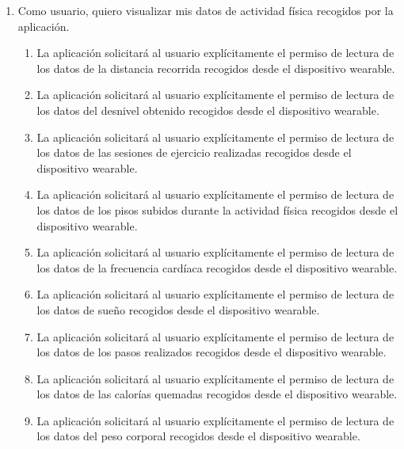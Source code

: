         \begin{enumerate}[resume=req-usuario,label=\textbf{\texttt{RU-\arabic*}}]
            \item \label{req:usuario:visualizar_actividad_fisica} Como usuario, quiero visualizar mis datos de actividad física recogidos por la aplicación.
            \begin{enumerate}[resume=req-funcionales,label=\textbf{\texttt{RF-\arabic*}}]
                \item \label{req:funcionales:permiso_distancia} La aplicación solicitará al usuario explícitamente el permiso de lectura de los datos de la distancia recorrida recogidos desde el dispositivo \gls{wearable}.
                \item \label{req:funcionales:permiso_desnivel} La aplicación solicitará al usuario explícitamente el permiso de lectura de los datos del desnivel obtenido recogidos desde el dispositivo \gls{wearable}. 
                \item \label{req:funcionales:permiso_ejercicio} La aplicación solicitará al usuario explícitamente el permiso de lectura de los datos de las sesiones de ejercicio realizadas recogidos desde el dispositivo \gls{wearable}.
                \item \label{req:funcionales:permiso_plantas} La aplicación solicitará al usuario explícitamente el permiso de lectura de los datos de los pisos subidos durante la actividad física recogidos desde el dispositivo \gls{wearable}.
                \item \label{req:funcionales:permiso_pulsaciones} La aplicación solicitará al usuario explícitamente el permiso de lectura de los datos de la frecuencia cardíaca recogidos desde el dispositivo \gls{wearable}.
                \item \label{req:funcionales:permiso_sueno} La aplicación solicitará al usuario explícitamente el permiso de lectura de los datos de sueño recogidos desde el dispositivo \gls{wearable}.
                \item \label{req:funcionales:permiso_pasos} La aplicación solicitará al usuario explícitamente el permiso de lectura de los datos de los pasos realizados recogidos desde el dispositivo \gls{wearable}.
                \item \label{req:funcionales:permiso_calorias} La aplicación solicitará al usuario explícitamente el permiso de lectura de los datos de las calorías quemadas recogidos desde el dispositivo \gls{wearable}.
                \item \label{req:funcionales:permiso_peso} La aplicación solicitará al usuario explícitamente el permiso de lectura de los datos del peso corporal recogidos desde el dispositivo \gls{wearable}.

\end{enumerate}
\end{enumerate}
